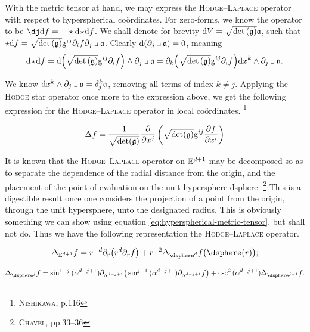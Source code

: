 With the metric tensor at hand, we may express the \textsc{Hodge}--\textsc{Laplace} operator with respect to hyperspherical coördinates.
For zero-forms, we know the operator to be $\codee\dee f = -\star\dee\!\star\!\dee f$.
We shall denote for brevity $\mathrm{d} V = \sqrt{\det{(\mathfrak{g})}}\mathfrak{a}$, such that $\star\dee f = \sqrt{\det{(\metrictensor)}} \metricg^{ij} \partial_i f \partial_j \iprod \afrak$.
Clearly $\dee(\partial_j\iprod\afrak) = 0$, meaning
\[
  \dee\!\star\!\dee f = \dee \Big( \sqrt{\det{(\metrictensor)}} \metricg^{ij} \partial_i f \Big) \wedge \partial_j \iprod \afrak = \partial_k \Big( \sqrt{\det{(\metrictensor)}} \metricg^{ij} \partial_i f \Big) \dee x^k \wedge \partial_j \iprod \afrak.
\]

\noindent
We know $\dee x^k \wedge \partial_j \iprod \afrak = \delta_{j}^{k} \afrak$, removing all terms of index $k \neq j$.
Applying the \textsc{Hodge} star operator once more to the expression above, we get the following expression for the \textsc{Hodge}--\textsc{Laplace} operator in local coördinates.%
\footnote{%
  \cite{nishikawa2002variational} \textsc{Nishikawa}, p.116
}

\begin{equation}\label{eq:Hodge-Laplace-scalar}
  \Delta f = \frac{1}{\sqrt{\det(\mathfrak{g})}} \frac{\partial}{\partial x^j} \left( \sqrt{\det(\mathfrak{g})} \mathrm{g}^{ij} \frac{\partial f}{\partial x^i} \right)
\end{equation}

\noindent
It is known that the \textsc{Hodge}--\textsc{Laplace} operator on $\mathbb{E}^{d+1}$ may be decomposed so as to separate the dependence of the radial distance from the origin, and the placement of the point of evaluation on the unit hypersphere \gls{dsphere}.%
\footnote{%
  \cite{chavel1984eigenvalues} \textsc{Chavel}, pp.33--36
}
%
This is a digestible result once one considers the projection of a point from the origin, through the unit hypersphere, unto the designated radius.
This is obviously something we can show using equation \eqref{eq:hyperspherical-metric-tensor}, but shall not do.
Thus we have the following representation the \textsc{Hodge}--\textsc{Laplace} operator.

\begin{equation}\label{eq:hyperspherical-laplacian}
  \Delta_{\euclidean^{d+1}} f = r^{-d} \partial_r \big( r^d \partial_r f \big) + r^{-2} \Delta_{\dsphere^d} f \big( \dsphere(r) \big);
\end{equation}

\begin{equation}\label{eq:angular-hyperspherical-laplacian}
  \Delta_{\dsphere^j} f = \sin^{1-j}{(\alpha^{d-j+1})} \partial_{\alpha^{d-j+1}} \big( \sin^{j-1}{(\alpha^{d-j+1})} \partial_{\alpha^{d-j+1}} f \big) + \csc^{2}{(\alpha^{d-j+1})} \Delta_{\dsphere^{j-1}} f.
\end{equation}

